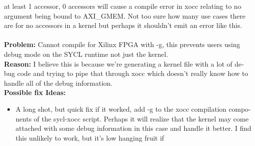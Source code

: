 \begin{otherlanguage}{english}
                                         at least 1 accessor, 0 accessors will
                                         cause a compile error in xocc relating
                                         to no argument being bound to
                                         AXI\_GMEM. Not too sure how many use
                                         cases there are for no accessors in a
                                         kernel but perhaps it shouldn't emit an
                                         error like this.
                                         \\
                                         \\
                                         \textbf{Problem:} Cannot compile for
                                         Xilinx FPGA with -g, this prevents
                                         users using debug mode on the SYCL
                                         runtime not just the kernel.
                                         \\
                                         \textbf{Reason:} I believe this is 
                                         because we're generating a kernel file
                                         with a lot of debug code and trying to
                                         pipe that through xocc which doesn't
                                         really know how to handle all of the
                                         debug information.
                                         \\
                                         \textbf{Possible fix Ideas:}
                                         \begin{itemize}
                                             \item A long shot, but quick fix if
                                                   it worked, add -g to the xocc
                                                   compilation components of the
                                                   sycl-xocc script. Perhaps it
                                                   will realize that the kernel
                                                   may come attached with some
                                                   debug information in this
                                                   case and handle it better. I
                                                   find this unlikely to work,
                                                   but it's low hanging fruit if

\end{itemize}
\end{otherlanguage}
